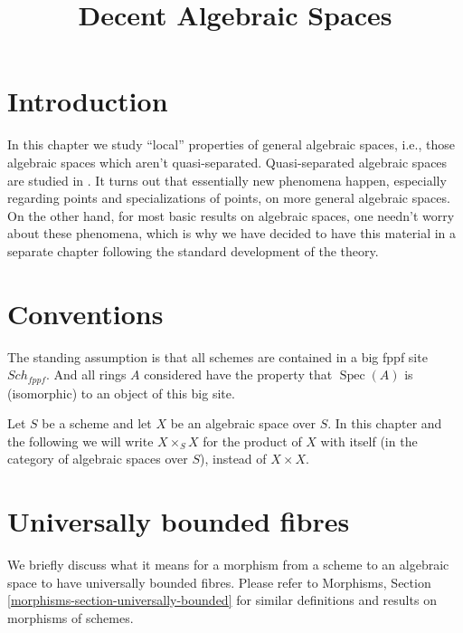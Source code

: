 \documentclass{stacks-project}
\theoremstyle{plain}
\theoremstyle{definition}
\theoremstyle{remark}
\numberwithin{equation}{subsection}
\def\Spec{\mathop{\mathrm{Spec}}}
\def\Sch{\mathit{Sch}}
\begin{document}
\title{Decent Algebraic Spaces}


\maketitle

\label{section-phantom}

\tableofcontents

\section{Introduction}
\label{section-introduction}

\noindent
In this chapter we study ``local'' properties of general
algebraic spaces, i.e., those algebraic spaces which aren't quasi-separated.
Quasi-separated algebraic spaces are studied in \cite{Kn}.
It turns out that essentially new phenomena happen, especially
regarding points and specializations of points, on more
general algebraic spaces. On the other hand, for most basic results
on algebraic spaces, one needn't worry about these phenomena, which is why
we have decided to have this material in a separate chapter following
the standard development of the theory.



\section{Conventions}
\label{section-conventions}

\noindent
The standing assumption is that all schemes are contained in
a big fppf site $\Sch_{fppf}$. And all rings $A$ considered
have the property that $\Spec(A)$ is (isomorphic) to an
object of this big site.

\medskip\noindent
Let $S$ be a scheme and let $X$ be an algebraic space over $S$.
In this chapter and the following we will write $X \times_S X$
for the product of $X$ with itself (in the category of algebraic
spaces over $S$), instead of $X \times X$.



\section{Universally bounded fibres}
\label{section-universally-bounded}

\noindent
We briefly discuss what it means for a morphism from a scheme to an
algebraic space to have universally bounded fibres. Please refer to
Morphisms, Section \ref{morphisms-section-universally-bounded}
for similar definitions and results on morphisms of schemes.
\end{document}
